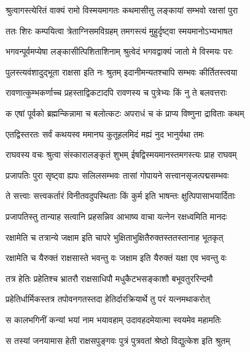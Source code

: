 
\twolineshloka
{श्रुत्वागस्त्येरितं वाक्यं रामो विस्मयमागतः}
{कथमासीत्तु लङ्कायां सम्भवो रक्षसां पुरा} %

\twolineshloka
{ततः शिरः कम्पयित्वा त्रेताग्निसमविग्रहम्}
{तमगस्त्यं मुहुर्दृष्ट्वा स्मयमानोऽभ्यभाषत} %

\twolineshloka
{भगवन्पूर्वमप्येषा लङ्कासीत्पिशिताशिनाम्}
{श्रुत्वेदं भगवद्वाक्यं जातो मे विस्मयः परः} %

\twolineshloka
{पुलस्त्यवंशादुद्भूता राक्षसा इति नः श्रुतम्}
{इदानीमन्यतश्चापि सम्भवः कीर्तितस्त्वया} %

\twolineshloka
{रावणात्कुम्भकर्णाच्च प्रहस्ताद्विकटादपि}
{रावणस्य च पुत्रेभ्यः किं नु ते बलवत्तराः} %

\twolineshloka
{क एषां पूर्वको ब्रह्मन्किन्नामा च बलोत्कटः}
{अपराधं च कं प्राप्य विष्णुना द्राविताः कथम्} %

\twolineshloka
{एतद्विस्तरतः सर्वं कथयस्व ममानघ}
{कुतूहलमिदं मह्यं नुद भानुर्यथा तमः} %

\twolineshloka
{राघवस्य वचः श्रुत्वा संस्कारालङ्कृतं शुभम्}
{ईषद्विस्मयमानस्तमगस्त्यः प्राह राघवम्} %

\twolineshloka
{प्रजापतिः पुरा सृष्ट्वा ह्यपः सलिलसम्भवः}
{तासां गोपायने सत्त्वानसृजत्पद्मसम्भवः} %

\twolineshloka
{ते सत्त्वाः सत्त्वकर्तारं विनीतवदुपस्थिताः}
{किं कुर्म इति भाषन्तः क्षुत्पिपासाभयार्दिताः} %

\twolineshloka
{प्रजापतिस्तु तान्याह सत्वानि प्रहसन्निव}
{आभाष्य वाचा यत्नेन रक्षध्वमिति मानदः} %

\twolineshloka
{रक्षामेति च तत्रान्ये जक्षाम इति चापरे}
{भुक्षिताभुक्षितैरुक्तस्ततस्तानाह भूतकृत्} %

\twolineshloka
{रक्षामेति च यैरुक्तं राक्षसास्ते भवन्तु वः}
{जक्षाम इति यैरुक्तं यक्षा एव भवन्तु वः} %

\twolineshloka
{तत्र हेतिः प्रहेतिश्च भ्रातरौ राक्षसाधिपौ}
{मधुकैटभसङ्काशौ बभूवतुररिन्दमौ} %

\twolineshloka
{प्रहेतिर्धार्मिकस्तत्र तपोवनगतस्तदा}
{हेतिर्दारक्रियार्थे तु परं यत्नमथाकरोत्} %

\twolineshloka
{स कालभगिनीं कन्यां भयां नाम भयावहाम्}
{उदावहदमेयात्मा स्वयमेव महामतिः} %

\twolineshloka
{स तस्यां जनयामास हेती राक्षसपुङ्गवः}
{पुत्रं पुत्रवतां श्रेष्ठो विद्युत्केश इति श्रुतम्} %

